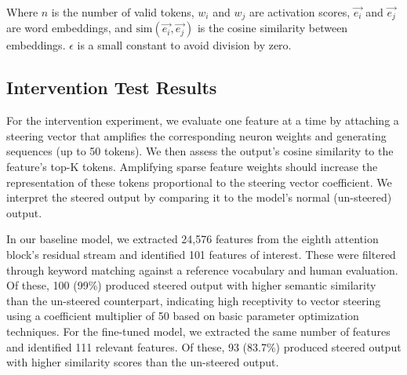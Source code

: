 Where $n$ is the number of valid tokens, $w_i$ and $w_j$ are activation scores, $\vec{e_i}$ and $\vec{e_j}$ are word embeddings, and $\text{sim}(\vec{e_i}, \vec{e_j})$ is the cosine similarity between embeddings. $\epsilon$ is a small constant to avoid division by zero.


\subsection{Intervention Test Results}

For the intervention experiment, we evaluate one feature at a time by attaching a steering vector that amplifies the corresponding neuron weights and generating sequences (up to 50 tokens). We then assess the output's cosine similarity to the feature's top-K tokens. Amplifying sparse feature weights should increase the representation of these tokens proportional to the steering vector coefficient. We interpret the steered output by comparing it to the model's normal (un-steered) output.

In our baseline model, we extracted 24,576 features from the eighth attention block's residual stream and identified 101 features of interest. These were filtered through keyword matching against a reference vocabulary and human evaluation. Of these, 100 (99\%) produced steered output with higher semantic similarity than the un-steered counterpart, indicating high receptivity to vector steering using a coefficient multiplier of 50 based on basic parameter optimization techniques. For the fine-tuned model, we extracted the same number of features and identified 111 relevant features. Of these, 93 (83.7\%) produced steered output with higher similarity scores than the un-steered output.


